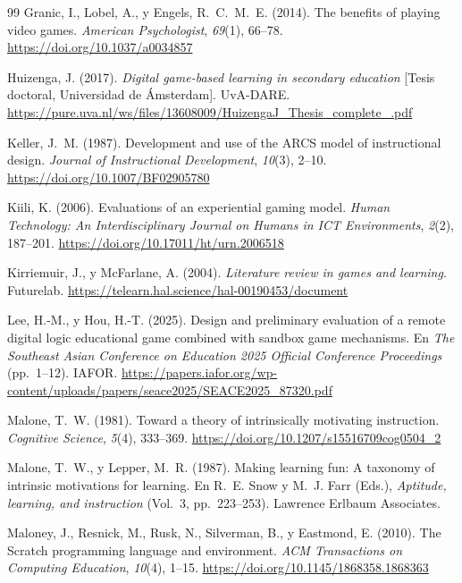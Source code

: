 \documentclass[a4paper,12pt]{article}
\begin{document}
\begin{thebibliography}{99}
Granic, I., Lobel, A., y Engels, R.~C.~M.~E. (2014). The benefits of playing video games. \textit{American Psychologist}, \textit{69}(1), 66--78. \url{https://doi.org/10.1037/a0034857}

Huizenga, J. (2017). \textit{Digital game-based learning in secondary education} [Tesis doctoral, Universidad de Ámsterdam]. UvA-DARE. \url{https://pure.uva.nl/ws/files/13608009/HuizengaJ_Thesis_complete_.pdf}

Keller, J.~M. (1987). Development and use of the ARCS model of instructional design. \textit{Journal of Instructional Development}, \textit{10}(3), 2--10. \url{https://doi.org/10.1007/BF02905780}

Kiili, K. (2006). Evaluations of an experiential gaming model. \textit{Human Technology: An Interdisciplinary Journal on Humans in ICT Environments}, \textit{2}(2), 187--201. \url{https://doi.org/10.17011/ht/urn.2006518}

Kirriemuir, J., y McFarlane, A. (2004). \textit{Literature review in games and learning}. Futurelab. \url{https://telearn.hal.science/hal-00190453/document}

Lee, H.-M., y Hou, H.-T. (2025). Design and preliminary evaluation of a remote digital logic educational game combined with sandbox game mechanisms. En \textit{The Southeast Asian Conference on Education 2025 Official Conference Proceedings} (pp.~1--12). IAFOR. \url{https://papers.iafor.org/wp-content/uploads/papers/seace2025/SEACE2025_87320.pdf}

Malone, T.~W. (1981). Toward a theory of intrinsically motivating instruction. \textit{Cognitive Science}, \textit{5}(4), 333--369. \url{https://doi.org/10.1207/s15516709cog0504_2}

Malone, T.~W., y Lepper, M.~R. (1987). Making learning fun: A taxonomy of intrinsic motivations for learning. En R.~E. Snow y M.~J. Farr (Eds.), \textit{Aptitude, learning, and instruction} (Vol.~3, pp.~223--253). Lawrence Erlbaum Associates.

Maloney, J., Resnick, M., Rusk, N., Silverman, B., y Eastmond, E. (2010). The Scratch programming language and environment. \textit{ACM Transactions on Computing Education}, \textit{10}(4), 1--15. \url{https://doi.org/10.1145/1868358.1868363}


\end{thebibliography}
\end{document}
